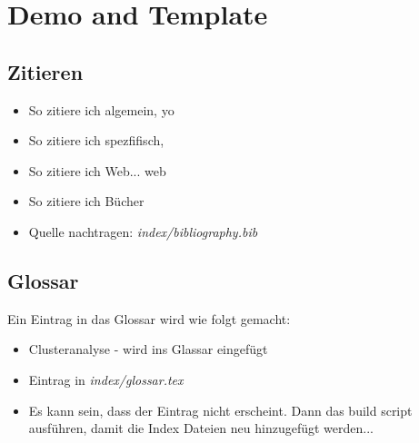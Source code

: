 \chapter{Demo and Template}
\section{Zitieren}
\begin{itemize}
	\item{So zitiere ich algemein, \cite{lin1973} yo}
	\item{So zitiere ich spezfifisch, \cite[S. 15]{lin1973}}
	\item{So zitiere ich Web... web \cite{learnHaskell}}
	\item{So zitiere ich Bücher \cite{goossens93} }
	\item{Quelle nachtragen: \textit{index/bibliography.bib}}
\end{itemize}


\section{Glossar}
Ein Eintrag in das Glossar wird wie folgt gemacht:
\begin{itemize}
	\item{\Gls{Clusteranalyse} - wird ins Glassar eingefügt}
	\item{Eintrag in \textit{index/glossar.tex}}
	\item{Es kann sein, dass der Eintrag nicht erscheint. Dann das build script ausführen, damit die Index Dateien neu hinzugefügt werden...}
\end{itemize}